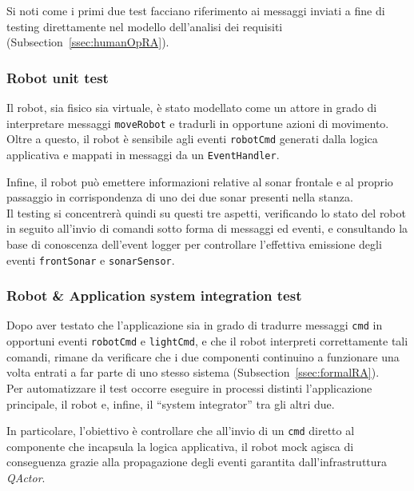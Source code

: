 \documentclass{../llncs}
\newcommand{\codescript}[1]{{\mbox{\small{\texttt{#1}}}}\xspace}
\newcommand{\qa}{\textsf{\textit{QActor}}\xspace}
\newcommand{\xss}[1]{\subsectionname~\ref{ssec:#1}}
\newcommand{\subsectionname}{Subsection}
\begin{document}
Si noti come i primi due test facciano riferimento ai messaggi inviati a fine di testing direttamente nel modello dell'analisi dei requisiti (\xss{humanOpRA}).

\subsubsection{Robot unit test}
Il robot, sia fisico sia virtuale, è stato modellato come un attore in grado di interpretare messaggi \codescript{moveRobot} e tradurli in opportune azioni di movimento. Oltre a questo, il robot è sensibile agli eventi \codescript{robotCmd} generati dalla logica applicativa e mappati in messaggi da un \codescript{EventHandler}.

Infine, il robot può emettere informazioni relative al sonar frontale e al proprio passaggio in corrispondenza di uno dei due sonar presenti nella stanza.\\

Il testing si concentrerà quindi su questi tre aspetti, verificando lo stato del robot in seguito all'invio di comandi sotto forma di messaggi ed eventi, e consultando la base di conoscenza dell'event logger per controllare l'effettiva emissione degli eventi \codescript{frontSonar} e \codescript{sonarSensor}.\\



\subsubsection{Robot \& Application system integration test}
Dopo aver testato che l'applicazione sia in grado di tradurre messaggi \codescript{cmd} in opportuni eventi \codescript{robotCmd} e \codescript{lightCmd}, e che il robot interpreti correttamente tali comandi, rimane da verificare che i due componenti continuino a funzionare una volta entrati a far parte di uno stesso sistema (\xss{formalRA}).\\

Per automatizzare il test occorre eseguire in processi distinti l'applicazione principale, il robot e, infine,
il ``system integrator'' tra gli altri due.

In particolare, l'obiettivo è controllare che all'invio di un \codescript{cmd} diretto al componente che incapsula la logica applicativa, il robot mock agisca di conseguenza grazie alla propagazione degli eventi garantita dall'infrastruttura {\qa}.\\
\end{document}
